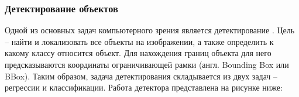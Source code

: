 \subsubsection{Детектирование объектов}

Одной из основных задач компьютерного зрения является детектирование \cite{lib-detection-task}. Цель -- найти и локализовать все объекты на изображении, а также определить к какому классу относится объект. Для нахождения границ объекта для него предсказываются координаты ограничивающей рамки (англ. Bounding Box или BBox). Таким образом, задача детектирования складывается из двух задач -- регрессии и классификации. Работа детектора представлена на рисунке ниже:


